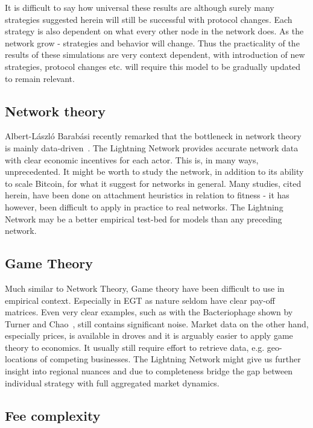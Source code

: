It is difficult to say how universal these results are although surely many strategies suggested herein will still be successful with protocol changes. Each strategy is also dependent on what every other \gls{node} in the network does. As the network grow - strategies and behavior will change. Thus the practicality of the results of these simulations are very context dependent, with introduction of new strategies, protocol changes etc. will require this model to be gradually updated to remain relevant.  

\subsection{Network theory}

Albert-László Barabási recently remarked that the bottleneck in network theory is mainly data-driven~\cite{barabasi:decade:beyond}. The \gls{Lightning Network} provides accurate network data with clear economic incentives for each actor. This is, in many ways, unprecedented. It might be worth to study the network, in addition to its ability to scale Bitcoin, for what it suggest for networks in general. Many studies, cited herein, have been done on attachment heuristics in relation to fitness - it has however, been difficult to apply in practice to real networks. The \gls{Lightning Network} may be a better empirical test-bed for models than any preceding network. 

\subsection{Game Theory}

Much similar to Network Theory, Game theory have been difficult to use in empirical context. Especially in EGT as nature seldom have clear pay-off matrices. Even very clear examples, such as with the Bacteriophage shown by Turner and Chao~\cite{turner:chao:prisoners:dilemma, nowak:sigmund:phage}, still contains significant noise. Market data on the other hand, especially prices, is available in droves and it is arguably easier to apply game theory to economics. It usually still require effort to retrieve data, e.g. geo-locations of competing businesses. The \gls{Lightning Network} might give us further insight into regional nuances and due to completeness bridge the gap between individual strategy with full aggregated market dynamics.    

\subsection{Fee complexity}

